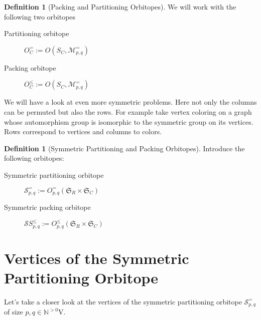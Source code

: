 \documentclass[a4paper]{amsart}
\theoremstyle{lemma}
\theoremstyle{definition}
\newtheorem{defn}[theorem]{Definition}
\theoremstyle{remark}
\newcommand\mpar[1]{\marginpar {\flushleft\sffamily\small #1}}
\newcommand{\todo}[1]{\mpar{#1}}
\newcommand{\lr}[1]{\ensuremath{\left( #1 \right)}}
\newcommand{\naturals}{\ensuremath{\mathbb{N}}}
\newcommand{\M}{\ensuremath{\mathcal{M}}}
\newcommand{\calS}{\ensuremath{\mathcal{S}}}
\newcommand{\Sym}{\ensuremath{\mathfrak{S}}}
\newcommand{\SymRC}{\ensuremath{\Sym_R \times \Sym_C}}
\begin{document}


\begin{defn}[Packing and Partitioning Orbitopes]
  We will work with the following two orbitopes
  \begin{description}
    \item[Partitioning orbitope] \(O^=_C := O \lr{S_C, \M_{p,q}^=}\)
    \item[Packing orbitope] \(O^{\leq}_C := O \lr{S_C, \M_{p,q}^=}\)
   \end{description}
\end{defn}

We will have a look at even more symmetric problems.  Here not only
the columns can be permuted but also the rows.  For example take
vertex coloring on a graph whose automorphism group is isomorphic to
the symmetric group on its vertices.  Rows correspond to vertices and
columns to colors.

\begin{defn}[Symmetric Partitioning and Packing Orbitopes]
Introduce the following orbitopes:
\begin{description}
\item[Symmetric partitioning orbitope] \(\calS^=_{p,q} := O^=_{p, q} \lr{\SymRC} \)
\item[Symmetric packing orbitope] \(\calS{S}^\leq_{p,q} := O^\leq_{p, q} \lr{\SymRC} \)
\end{description}
\end{defn}




\section{Vertices of the Symmetric Partitioning Orbitope}
Let's take a closer look at the vertices of the symmetric partitioning
orbitope \(\calS^=_{p, q}\) of size \(p, q \in \naturals^{>0}\)V.
\end{document}
